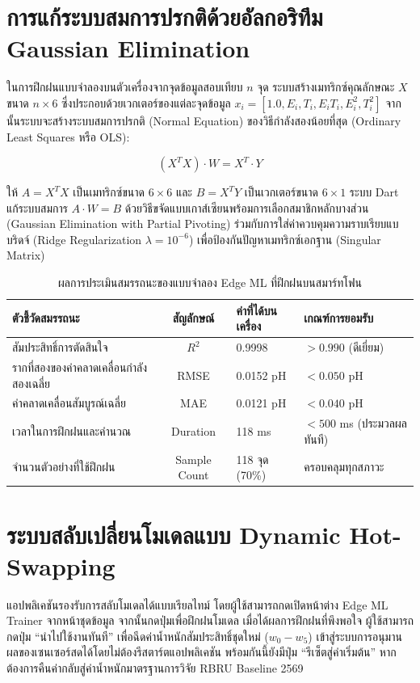 \section{การแก้ระบบสมการปรกติด้วยอัลกอริทึม Gaussian Elimination}
ในการฝึกฝนแบบจำลองบนตัวเครื่องจากจุดข้อมูลสอบเทียบ $n$ จุด ระบบสร้างเมทริกซ์คุณลักษณะ $X$ ขนาด $n \times 6$ ซึ่งประกอบด้วยเวกเตอร์ของแต่ละจุดข้อมูล $x_i = [1.0, E_i, T_i, E_i T_i, E_i^2, T_i^2]$ จากนั้นระบบจะสร้างระบบสมการปรกติ (Normal Equation) ของวิธีกำลังสองน้อยที่สุด (Ordinary Least Squares หรือ OLS):

\begin{equation}
(X^T X) \cdot W = X^T \cdot Y
\label{eq:normal_equation}
\end{equation}

ให้ $A = X^T X$ เป็นเมทริกซ์ขนาด $6 \times 6$ และ $B = X^T Y$ เป็นเวกเตอร์ขนาด $6 \times 1$ ระบบ Dart แก้ระบบสมการ $A \cdot W = B$ ด้วยวิธีขจัดแบบเกาส์เซียนพร้อมการเลือกสมาชิกหลักบางส่วน (Gaussian Elimination with Partial Pivoting) ร่วมกับการใส่ค่าควบคุมความราบเรียบแบบริดจ์ (Ridge Regularization $\lambda = 10^{-6}$) เพื่อป้องกันปัญหาเมทริกซ์เอกฐาน (Singular Matrix)

\begin{table}[H]
\caption{ผลการประเมินสมรรถนะของแบบจำลอง Edge ML ที่ฝึกฝนบนสมาร์ทโฟน}
\label{tab:edge_ml_metrics}
\centering
\begin{tabularx}{\textwidth}{p{4.5cm}cZZ}
\toprule
\textbf{ตัวชี้วัดสมรรถนะ} & \textbf{สัญลักษณ์} & \textbf{ค่าที่ได้บนเครื่อง} & \textbf{เกณฑ์การยอมรับ} \\
\midrule
สัมประสิทธิ์การตัดสินใจ & $R^2$ & 0.9998 & $> 0.990$ (ดีเยี่ยม) \\
รากที่สองของค่าคลาดเคลื่อนกำลังสองเฉลี่ย & RMSE & 0.0152 pH & $< 0.050$ pH \\
ค่าคลาดเคลื่อนสัมบูรณ์เฉลี่ย & MAE & 0.0121 pH & $< 0.040$ pH \\
เวลาในการฝึกฝนและคำนวณ & Duration & 118 ms & $< 500$ ms (ประมวลผลทันที) \\
จำนวนตัวอย่างที่ใช้ฝึกฝน & Sample Count & 118 จุด (70\%) & ครอบคลุมทุกสภาวะ \\
\bottomrule
\end{tabularx}
\end{table}

\section{ระบบสลับเปลี่ยนโมเดลแบบ Dynamic Hot-Swapping}
แอปพลิเคชันรองรับการสลับโมเดลได้แบบเรียลไทม์ โดยผู้ใช้สามารถกดเปิดหน้าต่าง Edge ML Trainer จากหน้าชุดข้อมูล จากนั้นกดปุ่มเพื่อฝึกฝนโมเดล เมื่อได้ผลการฝึกฝนที่พึงพอใจ ผู้ใช้สามารถกดปุ่ม ``นำไปใช้งานทันที'' เพื่อฉีดค่าน้ำหนักสัมประสิทธิ์ชุดใหม่ ($w_0 - w_5$) เข้าสู่ระบบการอนุมานผลของเซนเซอร์สดได้โดยไม่ต้องรีสตาร์ตแอปพลิเคชัน พร้อมกันนี้ยังมีปุ่ม ``รีเซ็ตสู่ค่าเริ่มต้น'' หากต้องการคืนค่ากลับสู่ค่าน้ำหนักมาตรฐานการวิจัย RBRU Baseline 2569

\clearpage
